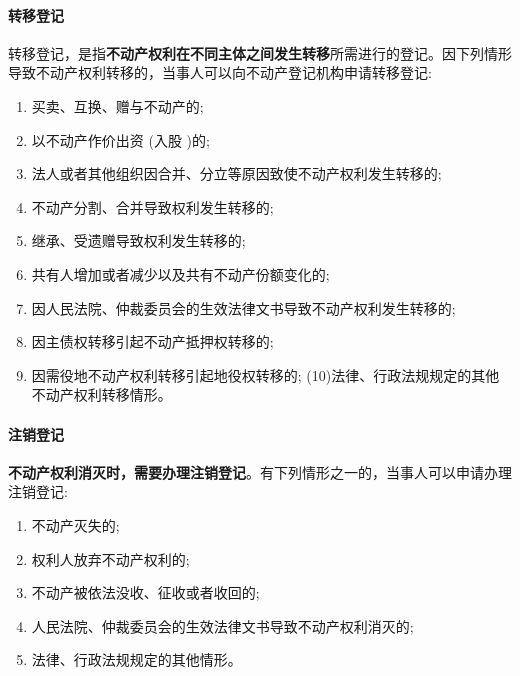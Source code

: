 \documentclass[UTF8,12pt]{ctexart}
\numberwithin{equation}{section} %
\numberwithin{figure}{section}
\numberwithin{table}{section}
\begin{document}
	\paragraph{转移登记} 
	转移登记，是指\textbf{不动产权利在不同主体之间发生转移}所需进行的登记。因下列情形导致不动产权利转移的，当事人可以向不动产登记机构申请转移登记: 
	\begin{enumerate}
		\item 买卖、互换、赠与不动产的;
		
		\item 以不动产作价出资 (入股 )的;
		
		\item 法人或者其他组织因合并、分立等原因致使不动产权利发生转移的;
		
		\item 不动产分割、合并导致权利发生转移的;
		
		\item 继承、受遗赠导致权利发生转移的;
		
		\item 共有人增加或者减少以及共有不动产份额变化的;
		
		\item 因人民法院、仲裁委员会的生效法律文书导致不动产权利发生转移的;
		
		\item 因主债权转移引起不动产抵押权转移的;
		
		\item 因需役地不动产权利转移引起地役权转移的; (10)法律、行政法规规定的其他不动产权利转移情形。
	\end{enumerate}
	
	
	\paragraph{注销登记} 
	\textbf{不动产权利消灭时，需要办理注销登记}。有下列情形之一的，当事人可以申请办理注销登记: 
	\begin{enumerate}
		\item 不动产灭失的;
		
		\item 权利人放弃不动产权利的;
		
		\item 不动产被依法没收、征收或者收回的;
		
		\item 人民法院、仲裁委员会的生效法律文书导致不动产权利消灭的;
		
		\item 法律、行政法规规定的其他情形。
	\end{enumerate}
	
\end{document}
